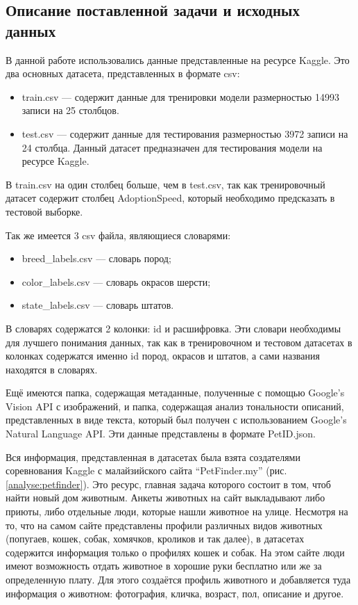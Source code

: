 \documentclass[14pt]{mmcs_article}
\begin{document}
\subsection{Описание поставленной задачи и исходных данных}

В данной работе использовались данные представленные на ресурсе Kaggle.  Это два основных датасета, представленных в формате csv:

\begin{itemize}
	\item train.csv --- содержит данные для тренировки модели размерностью 14993 записи на 25 столбцов.
	\item test.csv --- содержит данные для тестирования размерностью 3972 записи на 24 столбца. Данный датасет предназначен для тестирования модели на ресурсе Kaggle.
\end{itemize}

В train.csv на один столбец больше, чем в test.csv, так как тренировочный датасет содержит столбец AdoptionSpeed, который необходимо предсказать в тестовой выборке.

Так же имеется 3 csv файла, являющиеся словарями:

\begin{itemize}
	\item breed\_labels.csv --- словарь пород;
	\item color\_labels.csv --- словарь окрасов шерсти;
	\item state\_labels.csv --- словарь штатов.
\end{itemize}

В словарях содержатся 2 колонки: id и расшифровка. Эти словари необходимы для лучшего понимания данных, так как в тренировочном и тестовом датасетах в колонках содержатся именно id пород, окрасов и штатов, а сами названия находятся в словарях.

Ещё имеются папка, содержащая метаданные, полученные с помощью Google’s Vision API с изображений, и папка, содержащая анализ тональности описаний, представленных в виде текста, который был получен с использованием Google’s Natural Language API. Эти данные представлены в формате PetID.json.

Вся информация, представленная в датасетах была взята создателями соревнования Kaggle с малайзийского сайта ``PetFinder.my'' (рис. \ref{analyse:petfinder}). Это ресурс, главная задача которого состоит в том, чтоб найти новый дом животным. Анкеты животных на сайт выкладывают либо приюты, либо отдельные люди, которые нашли животное на улице. Несмотря на то, что на самом сайте представлены профили различных видов животных (попугаев, кошек, собак, хомячков, кроликов и так далее), в датасетах содержится информация только о профилях кошек и собак. На этом сайте люди имеют возможность отдать животное в хорошие руки бесплатно или же за определенную плату. Для этого создаётся профиль животного и добавляется туда информация о животном: фотография, кличка, возраст, пол, описание и другое.
\end{document}
